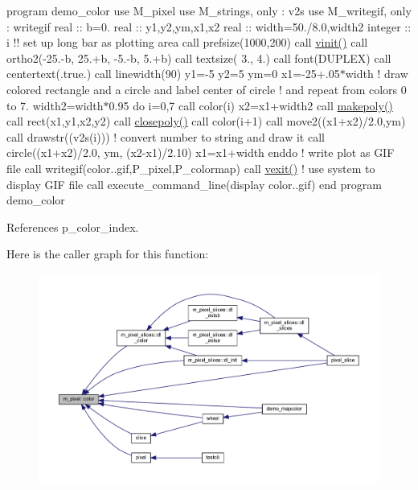 program demo\+\_\+color use M\+\_\+pixel use M\+\_\+strings, only \+: v2s use M\+\_\+writegif, only \+: writegif real \+:\+: b=0. real \+:\+: y1,y2,ym,x1,x2 real \+:\+: width=50./8.0,width2 integer \+:\+: i !! set up long bar as plotting area call prefsize(1000,200) call \hyperlink{namespacem__pixel_ac03ca8f23fdadb60599b6ea4dc87a6d9}{vinit()} call ortho2(-\/25.-\/b, 25.+b, -\/5.-\/b, 5.+b) call textsize( 3., 4.) call font(\textquotesingle{}D\+U\+P\+L\+EX\textquotesingle{}) call centertext(.true.) call linewidth(90) y1=-\/5 y2=5 ym=0 x1=-\/25+.05$\ast$width ! draw colored rectangle and a circle and label center of circle ! and repeat from colors 0 to 7. width2=width$\ast$0.95 do i=0,7 call color(i) x2=x1+width2 call \hyperlink{namespacem__pixel_ab7128437f95b40004bf73fc6e3f597f8}{makepoly()} call rect(x1,y1,x2,y2) call \hyperlink{namespacem__pixel_ab3dc83b63d2ab1bf3f63932abca4245d}{closepoly()} call color(i+1) call move2((x1+x2)/2.0,ym) call drawstr((v2s(i))) ! convert number to string and draw it call circle((x1+x2)/2.0, ym, (x2-\/x1)/2.10) x1=x1+width enddo ! write plot as G\+IF file call writegif(\textquotesingle{}color..\+gif\textquotesingle{},P\+\_\+pixel,P\+\_\+colormap) call \hyperlink{namespacem__pixel_a19ad6b65752322b0029a62cc0ebec3e8}{vexit()} ! use system to display G\+IF file call execute\+\_\+command\+\_\+line(\textquotesingle{}display color..\+gif\textquotesingle{}) end program demo\+\_\+color 

References p\+\_\+color\+\_\+index.

Here is the caller graph for this function\+:
\nopagebreak
\begin{figure}[H]
\begin{center}
\leavevmode
\includegraphics[width=350pt]{namespacem__pixel_a334bde41bc7b2db19b950b1271ba7463_icgraph}
\end{center}
\end{figure}
\mbox{\label{namespacem__pixel_a12012e819bb14b27d2b49732aa2e4e55}} 
